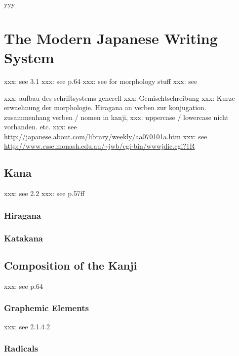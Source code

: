 yyy



\section{The Modern Japanese Writing System}
\label{sec:modernjapanesewritingsystem}

xxx: see  3.1
xxx: see  p.64
xxx: see  for morphology stuff
xxx: see 

xxx: aufbau des schriftsystems generell
xxx: Gemischtschreibung
xxx: Kurze erwaehnung der morphologie. Hiragana an verben zur konjugation.
     zusammenhang verben / nomen in kanji, 
xxx: uppercase / lowercase nicht vorhanden. etc.
xxx: see \url{http://japanese.about.com/library/weekly/aa070101a.htm}
xxx: see \url{http://www.csse.monash.edu.au/~jwb/cgi-bin/wwwjdic.cgi?1R}

\subsection{Kana }
\label{sec:kana}

xxx: see  2.2
xxx: see  p.57ff

\subsubsection{Hiragana }
\label{sec:hiragana}

\subsubsection{Katakana }
\label{sec:katakana}

\subsection{Composition of the Kanji }
\label{sec:compositionofkanji}

xxx: see  p.64

\subsubsection{Graphemic Elements}
\label{sec:graphemicelements}

xxx: see  2.1.4.2

\subsubsection{Radicals}
\label{sec:radicals}

